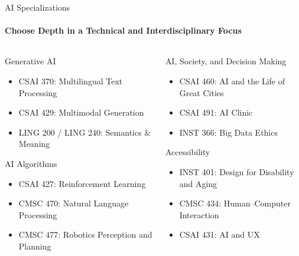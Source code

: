 \documentclass[compress]{beamer}
\begin{document}
\begin{frame}{AI Specializations}
\framesubtitle{Choose Depth in a Technical and Interdisciplinary Focus}
\begin{columns}
  \begin{column}{0.48\textwidth}
    \begin{block}{Generative AI}
      \begin{itemize}
\tiny
        \item CSAI 370: Multilingual Text Processing  
        \item CSAI 429: Multimodal Generation  
        \item LING 200 / LING 240: Semantics \& Meaning
      \end{itemize}
    \end{block}

    \begin{block}{AI Algorithms}
      \begin{itemize}
\tiny        \item CSAI 427: Reinforcement Learning  
        \item CMSC 470: Natural Language Processing  
        \item CMSC 477: Robotics Perception and Planning
      \end{itemize}
    \end{block}
  \end{column}

  \begin{column}{0.48\textwidth}
    \begin{block}{AI, Society, and Decision Making}
      \begin{itemize}
\tiny        \item CSAI 460: AI and the Life of Great Cities  
        \item CSAI 491: AI Clinic  
        \item INST 366: Big Data Ethics
      \end{itemize}
    \end{block}

    \begin{block}{Accessibility}
      \begin{itemize}
\tiny        \item INST 401: Design for Disability and Aging  
        \item CMSC 434: Human–Computer Interaction  
        \item CSAI 431: AI and UX
      \end{itemize}
    \end{block}
  \end{column}
\end{columns}
\end{frame}
\end{document}
